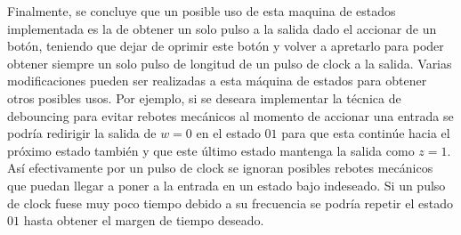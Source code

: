 Finalmente, se concluye que un posible uso de esta maquina de estados implementada es la de obtener un solo pulso a la salida dado el accionar de un botón, teniendo que dejar de oprimir este botón y volver a apretarlo para poder obtener siempre un solo pulso de longitud de un pulso de clock a la salida. Varias modificaciones pueden ser realizadas a esta máquina de estados para obtener otros posibles usos. Por ejemplo, si se deseara implementar la técnica de debouncing para evitar rebotes mecánicos al momento de accionar una entrada se podría redirigir la salida de $w=0$ en el estado $01$ para que esta continúe hacia el próximo estado también y que este último estado mantenga la salida como $z=1$. Así efectivamente por un pulso de clock se ignoran posibles rebotes mecánicos que puedan llegar a poner a la entrada en un estado bajo indeseado. Si un pulso de clock fuese muy poco tiempo debido a su frecuencia se podría repetir el estado $01$ hasta obtener el margen de tiempo deseado.
